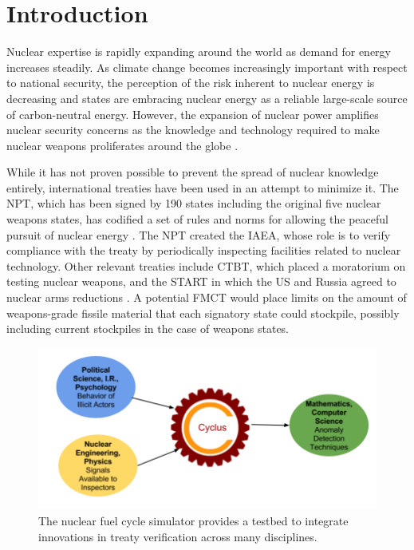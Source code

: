 \section{Introduction}
\label{s_motive}


Nuclear expertise is rapidly expanding around the world as demand for energy increases steadily\cite{mooney_why_2014}.  As climate change becomes increasingly important with respect to national security, the perception of the risk inherent to nuclear energy is decreasing and states are embracing nuclear energy as a reliable large-scale source of carbon-neutral energy.  However, the expansion of nuclear power amplifies nuclear security concerns as the knowledge and technology required to make nuclear weapons proliferates around the globe \cite{feiveson_unmaking_2014}.  

While it has not proven possible to prevent the spread of nuclear knowledge entirely, international treaties have been used in an attempt to minimize it.  The \gls{NPT}, which has been signed by 190 states including the original five nuclear weapons states, has codified a set of rules and norms for allowing the peaceful pursuit of nuclear energy \cite{_treaty_????}.  The \gls{NPT} created the \gls{IAEA}, whose role is to verify compliance with the treaty by periodically inspecting facilities related to nuclear technology.  Other relevant treaties include \gls{CTBT}, which placed a moratorium on testing nuclear weapons, and the \gls{START} in which the \gls{US} and Russia agreed to nuclear arms reductions \cite{_treaty:_????, department_of_State_new_2010}.  A potential \gls{FMCT} would place limits on the amount of weapons-grade fissile material that each signatory state could stockpile, possibly including current stockpiles in the case of weapons states.

\begin{figure}%
\begin{center}
\includegraphics[natwidth=162bp,natheight=227bp, scale=0.45]{./figs/cyclus_interdiscipline.png}
\end{center}
\caption{The \Cyclus nuclear fuel cycle simulator provides a testbed to integrate innovations in treaty verification across many disciplines.}
\label{fig:cyclus_diagram}
\end{figure}

